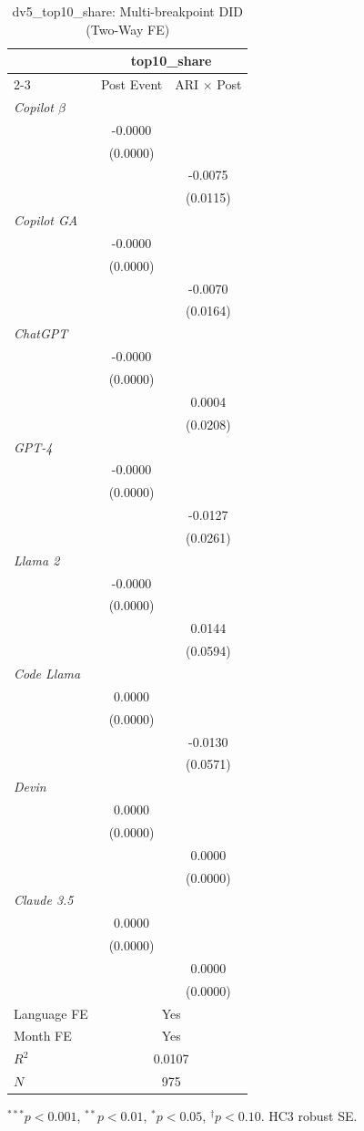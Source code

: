 \begin{table}[htbp]\centering
\caption{dv5_top10_share: Multi-breakpoint DID (Two-Way FE)}
\begin{tabular}{lcc}
\toprule
 & \multicolumn{2}{c}{top10_share} \\
\cmidrule(l){2-3}
 & Post Event & ARI $\times$ Post \\
\midrule
\textit{Copilot $\beta$} & & \\
 & -0.0000 & \\
 & (0.0000) & \\
 &  & -0.0075 \\
 &  & (0.0115) \\
\textit{Copilot GA} & & \\
 & -0.0000 & \\
 & (0.0000) & \\
 &  & -0.0070 \\
 &  & (0.0164) \\
\textit{ChatGPT} & & \\
 & -0.0000 & \\
 & (0.0000) & \\
 &  & 0.0004 \\
 &  & (0.0208) \\
\textit{GPT-4} & & \\
 & -0.0000 & \\
 & (0.0000) & \\
 &  & -0.0127 \\
 &  & (0.0261) \\
\textit{Llama 2} & & \\
 & -0.0000 & \\
 & (0.0000) & \\
 &  & 0.0144 \\
 &  & (0.0594) \\
\textit{Code Llama} & & \\
 & 0.0000 & \\
 & (0.0000) & \\
 &  & -0.0130 \\
 &  & (0.0571) \\
\textit{Devin} & & \\
 & 0.0000 & \\
 & (0.0000) & \\
 &  & 0.0000 \\
 &  & (0.0000) \\
\textit{Claude 3.5} & & \\
 & 0.0000 & \\
 & (0.0000) & \\
 &  & 0.0000 \\
 &  & (0.0000) \\
\midrule
Language FE & \multicolumn{2}{c}{Yes} \\
Month FE    & \multicolumn{2}{c}{Yes} \\
$R^2$ & \multicolumn{2}{c}{0.0107} \\
$N$   & \multicolumn{2}{c}{975} \\
\bottomrule
\end{tabular}
{\footnotesize $^{***}p<0.001$, $^{**}p<0.01$, $^{*}p<0.05$, $^{\dagger}p<0.10$. HC3 robust SE.}
\end{table}